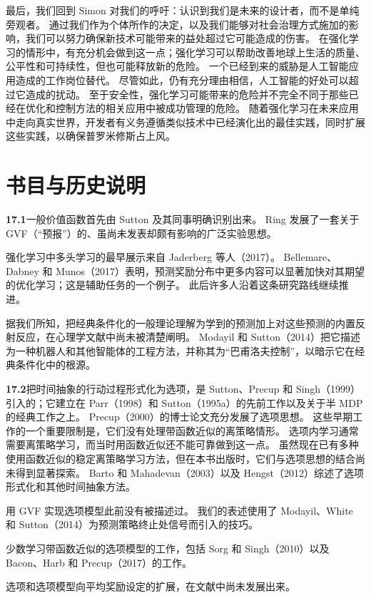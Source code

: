 \documentclass[UTF8, 12pt, fontset=fandol, oneside]{ctexart}
\begin{document}
最后，我们回到 Simon 对我们的呼吁：认识到我们是未来的设计者，而不是单纯旁观者。
通过我们作为个体所作的决定，以及我们能够对社会治理方式施加的影响，我们可以努力确保新技术可能带来的益处超过它可能造成的伤害。
在强化学习的情形中，有充分机会做到这一点；强化学习可以帮助改善地球上生活的质量、公平性和可持续性，但也可能释放新的危险。
一个已经到来的威胁是人工智能应用造成的工作岗位替代。
尽管如此，仍有充分理由相信，人工智能的好处可以超过它造成的扰动。
至于安全性，强化学习可能带来的危险并不完全不同于那些已经在优化和控制方法的相关应用中被成功管理的危险。
随着强化学习在未来应用中走向真实世界，开发者有义务遵循类似技术中已经演化出的最佳实践，同时扩展这些实践，以确保普罗米修斯占上风。

\section*{书目与历史说明}

\noindent\textbf{17.1}\quad 一般价值函数首先由 Sutton 及其同事明确识别出来。
Ring 发展了一套关于 GVF（“预报”）的、虽尚未发表却颇有影响的广泛实验思想。

强化学习中多头学习的最早展示来自 Jaderberg 等人（2017）。
Bellemare、Dabney 和 Munos（2017）表明，预测奖励分布中更多内容可以显著加快对其期望的优化学习；这是辅助任务的一个例子。
此后许多人沿着这条研究路线继续推进。

据我们所知，把经典条件化的一般理论理解为学到的预测加上对这些预测的内置反射反应，在心理学文献中尚未被清楚阐明。
Modayil 和 Sutton（2014）把它描述为一种机器人和其他智能体的工程方法，并称其为“巴甫洛夫控制”，以暗示它在经典条件化中的根源。

\noindent\textbf{17.2}\quad 把时间抽象的行动过程形式化为选项，是 Sutton、Precup 和 Singh（1999）引入的；它建立在 Parr（1998）和 Sutton（1995a）的先前工作以及关于半 MDP 的经典工作之上。
Precup（2000）的博士论文充分发展了选项思想。
这些早期工作的一个重要限制是，它们没有处理带函数近似的离策略情形。
选项内学习通常需要离策略学习，而当时用函数近似还不能可靠做到这一点。
虽然现在已有多种使用函数近似的稳定离策略学习方法，但在本书出版时，它们与选项思想的结合尚未得到显著探索。
Barto 和 Mahadevan（2003）以及 Hengst（2012）综述了选项形式化和其他时间抽象方法。

用 GVF 实现选项模型此前没有被描述过。
我们的表述使用了 Modayil、White 和 Sutton（2014）为预测策略终止处信号而引入的技巧。

少数学习带函数近似的选项模型的工作，包括 Sorg 和 Singh（2010）以及 Bacon、Harb 和 Precup（2017）的工作。

选项和选项模型向平均奖励设定的扩展，在文献中尚未发展出来。
\end{document}
